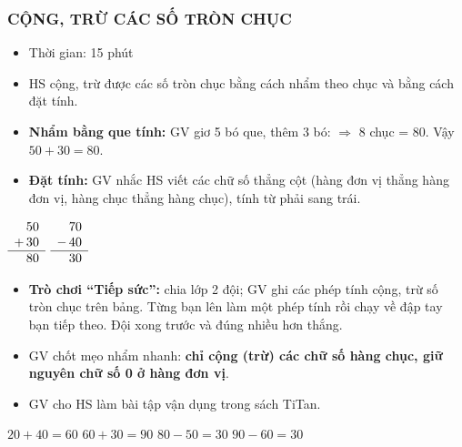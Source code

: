 \documentclass[../main.tex]{subfiles}
\begin{document}
\subsubsection{CỘNG, TRỪ CÁC SỐ TRÒN CHỤC}
\begin{hd}
    \begin{itemize}
        \item Thời gian: 15 phút
        \item HS cộng, trừ được các số tròn chục bằng cách nhẩm theo chục và bằng cách đặt tính.
    \end{itemize}
\end{hd}
\begin{itemize}
    \item \textbf{Nhẩm bằng que tính:} GV giơ 5 bó que, thêm 3 bó:  $\Rightarrow$ 8 chục = 80. Vậy $50 + 30 = 80$.
    \item \textbf{Đặt tính:} GV nhắc HS viết các chữ số thẳng cột (hàng đơn vị thẳng hàng đơn vị, hàng chục thẳng hàng chục), tính từ phải sang trái.
\end{itemize}
\begin{center}
    \Large
    $\begin{array}{r@{\,}r}
        & 50\\
      + & 30\\ \hline
        & 80
    \end{array}$
    \qquad\qquad
    $\begin{array}{r@{\,}r}
        & 70\\
      - & 40\\ \hline
        & 30
    \end{array}$
\end{center}
\begin{itemize}
    \item \textbf{Trò chơi “Tiếp sức”:} chia lớp 2 đội; GV ghi các phép tính cộng, trừ số tròn chục trên bảng. Từng bạn lên làm một phép tính rồi chạy về đập tay bạn tiếp theo. Đội xong trước và đúng nhiều hơn thắng.
    \item GV chốt mẹo nhẩm nhanh: \textbf{chỉ cộng (trừ) các chữ số hàng chục, giữ nguyên chữ số 0 ở hàng đơn vị}.
    \item GV cho HS làm bài tập vận dụng trong sách TiTan.
\end{itemize}
\begin{vd}
    $20 + 40 = 60$ \qquad $60 + 30 = 90$ \qquad $80 - 50 = 30$ \qquad $90 - 60 = 30$
\end{vd}
\end{document}
